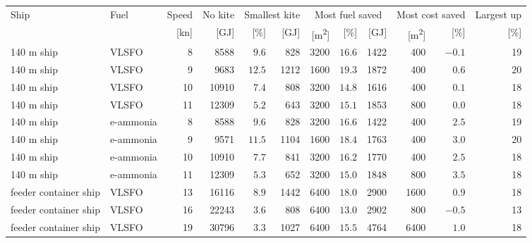 \begin{tabular}{@{}llrrrrrrrrrr@{}}
\toprule
Ship & Fuel & Speed & No kite & \multicolumn{2}{c}{Smallest kite} & \multicolumn{3}{c}{Most fuel saved} & \multicolumn{2}{c}{Most cost saved} & Largest up \\
\cmidrule(lr){5-6}\cmidrule(lr){7-9}\cmidrule(lr){10-11}
 & & [kn] & [GJ] & [\%] & [GJ] & [\si{m^2}] & [\%] & [GJ] & [\si{m^2}] & [\%] & [\%] \\
\midrule
140 m ship & VLSFO & 8 & 8588 & \cellcolor{gain!20}\(9.6\) & 828 & 3200 & \cellcolor{gain!34}\(16.6\) & 1422 & 400 & \cellcolor{loss!2}\(-0.1\) & 19 \\
140 m ship & VLSFO & 9 & 9683 & \cellcolor{gain!26}\(12.5\) & 1212 & 1600 & \cellcolor{gain!40}\(19.3\) & 1872 & 400 & \cellcolor{gain!7}\(0.6\) & 20 \\
140 m ship & VLSFO & 10 & 10910 & \cellcolor{gain!15}\(7.4\) & 808 & 3200 & \cellcolor{gain!31}\(14.8\) & 1616 & 400 & \cellcolor{gain!2}\(0.1\) & 18 \\
140 m ship & VLSFO & 11 & 12309 & \cellcolor{gain!11}\(5.2\) & 643 & 3200 & \cellcolor{gain!31}\(15.1\) & 1853 & 800 & \cellcolor{loss!1}\(0.0\) & 18 \\
140 m ship & e-ammonia & 8 & 8588 & \cellcolor{gain!20}\(9.6\) & 828 & 3200 & \cellcolor{gain!34}\(16.6\) & 1422 & 400 & \cellcolor{gain!28}\(2.5\) & 19 \\
140 m ship & e-ammonia & 9 & 9571 & \cellcolor{gain!24}\(11.5\) & 1104 & 1600 & \cellcolor{gain!38}\(18.4\) & 1763 & 400 & \cellcolor{gain!35}\(3.0\) & 20 \\
140 m ship & e-ammonia & 10 & 10910 & \cellcolor{gain!16}\(7.7\) & 841 & 3200 & \cellcolor{gain!34}\(16.2\) & 1770 & 400 & \cellcolor{gain!28}\(2.5\) & 18 \\
140 m ship & e-ammonia & 11 & 12309 & \cellcolor{gain!11}\(5.3\) & 652 & 3200 & \cellcolor{gain!31}\(15.0\) & 1848 & 800 & \cellcolor{gain!40}\(3.5\) & 18 \\
feeder container ship & VLSFO & 13 & 16116 & \cellcolor{gain!19}\(8.9\) & 1442 & 6400 & \cellcolor{gain!37}\(18.0\) & 2900 & 1600 & \cellcolor{gain!11}\(0.9\) & 18 \\
feeder container ship & VLSFO & 16 & 22243 & \cellcolor{gain!8}\(3.6\) & 808 & 6400 & \cellcolor{gain!27}\(13.0\) & 2902 & 800 & \cellcolor{loss!6}\(-0.5\) & 13 \\
feeder container ship & VLSFO & 19 & 30796 & \cellcolor{gain!7}\(3.3\) & 1027 & 6400 & \cellcolor{gain!32}\(15.5\) & 4764 & 6400 & \cellcolor{gain!12}\(1.0\) & 18 \\
\bottomrule
\end{tabular}
